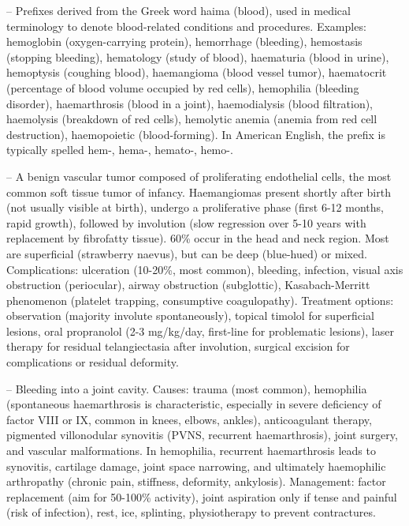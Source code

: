 -- Prefixes derived from the Greek word haima (blood), used in medical terminology to denote blood-related conditions and procedures. Examples: hemoglobin (oxygen-carrying protein), hemorrhage (bleeding), hemostasis (stopping bleeding), hematology (study of blood), haematuria (blood in urine), hemoptysis (coughing blood), haemangioma (blood vessel tumor), haematocrit (percentage of blood volume occupied by red cells), hemophilia (bleeding disorder), haemarthrosis (blood in a joint), haemodialysis (blood filtration), haemolysis (breakdown of red cells), hemolytic anemia (anemia from red cell destruction), haemopoietic (blood-forming). In American English, the prefix is typically spelled hem-, hema-, hemato-, hemo-.

-- A benign vascular tumor composed of proliferating endothelial cells, the most common soft tissue tumor of infancy. Haemangiomas present shortly after birth (not usually visible at birth), undergo a proliferative phase (first 6-12 months, rapid growth), followed by involution (slow regression over 5-10 years with replacement by fibrofatty tissue). 60\% occur in the head and neck region. Most are superficial (strawberry naevus), but can be deep (blue-hued) or mixed. Complications: ulceration (10-20\%, most common), bleeding, infection, visual axis obstruction (periocular), airway obstruction (subglottic), Kasabach-Merritt phenomenon (platelet trapping, consumptive coagulopathy). Treatment options: observation (majority involute spontaneously), topical timolol for superficial lesions, oral propranolol (2-3 mg/kg/day, first-line for problematic lesions), laser therapy for residual telangiectasia after involution, surgical excision for complications or residual deformity.

-- Bleeding into a joint cavity. Causes: trauma (most common), hemophilia (spontaneous haemarthrosis is characteristic, especially in severe deficiency of factor VIII or IX, common in knees, elbows, ankles), anticoagulant therapy, pigmented villonodular synovitis (PVNS, recurrent haemarthrosis), joint surgery, and vascular malformations. In hemophilia, recurrent haemarthrosis leads to synovitis, cartilage damage, joint space narrowing, and ultimately haemophilic arthropathy (chronic pain, stiffness, deformity, ankylosis). Management: factor replacement (aim for 50-100\% activity), joint aspiration only if tense and painful (risk of infection), rest, ice, splinting, physiotherapy to prevent contractures.

